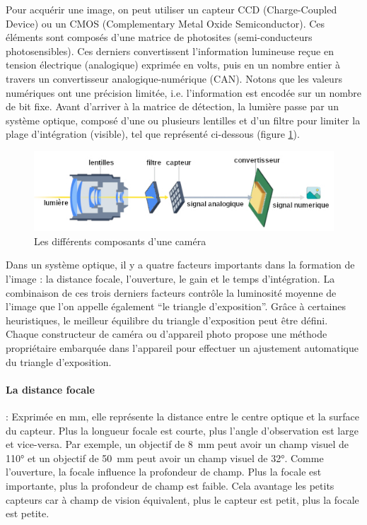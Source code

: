 \documentclass[../thesis.tex]{subfiles}
\begin{document}
    Pour acquérir une image, on peut utiliser un capteur CCD (Charge-Coupled Device) ou un CMOS (Complementary Metal Oxide Semiconductor). Ces éléments sont composés d'une matrice de photosites (semi-conducteurs photosensibles). Ces derniers convertissent l'information lumineuse reçue en tension électrique (analogique) exprimée en volts, puis en un nombre entier à travers un convertisseur analogique-numérique (CAN). Notons que les valeurs numériques ont une précision limitée, i.e. l'information est encodée sur un nombre de bit fixe. Avant d'arriver à la matrice de détection, la lumière passe par un système optique, composé d'une ou plusieurs lentilles et d'un filtre pour limiter la plage d'intégration (visible), tel que représenté ci-dessous (figure \ref{fig:03-image-formation}).
    
    \vfill
    \begin{figure}[H]
        \centering
        \includegraphics[width=0.7\linewidth]{img/biblio/image-formation}
        \caption{Les différents composants d'une caméra}
        \label{fig:03-image-formation}
    \end{figure}
    \vfill
    
    
    Dans un système optique, il y a quatre facteurs importants dans la formation de l'image : la distance focale, l'ouverture, le gain et le temps d'intégration. La combinaison de ces trois derniers facteurs contrôle la luminosité moyenne de l'image que l'on appelle également ``le triangle d'exposition''. Grâce à certaines heuristiques, le meilleur équilibre du triangle d'exposition peut être défini. Chaque constructeur de caméra ou d'appareil photo propose une méthode propriétaire embarquée dans l'appareil pour effectuer un ajustement automatique du triangle d'exposition.
    
    \newpage
    \paragraph{La distance focale} : Exprimée en mm, elle représente la distance entre le centre optique et la surface du capteur. Plus la longueur focale est courte, plus l'angle d'observation est large et vice-versa. Par exemple, un objectif de \SI{8}{mm} peut avoir un champ visuel de 110° et un objectif de \SI{50}{mm} peut avoir un champ visuel de 32°. Comme l'ouverture, la focale influence la profondeur de champ. Plus la focale est importante, plus la profondeur de champ est faible. Cela avantage les petits capteurs car à champ de vision équivalent, plus le capteur est petit, plus la focale est petite.
    
\end{document}
